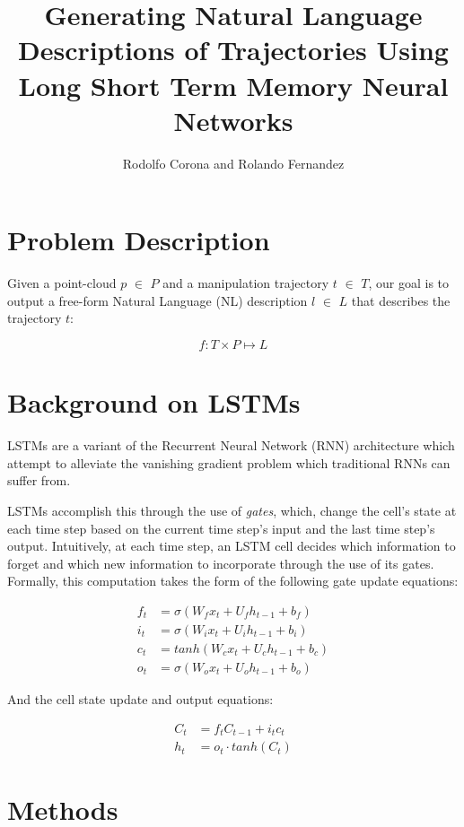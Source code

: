 \documentclass[letterpaper, 12 pt, conference]{ieeeconf}
\title{\LARGE \bf
Generating Natural Language Descriptions of Trajectories Using Long Short Term Memory Neural Networks}
\author{Rodolfo Corona and Rolando Fernandez}
\begin{document}
\maketitle
\thispagestyle{empty}
\pagestyle{empty}

\section{Problem Description}

Given a point-cloud $p$ $\in$ $P$ and a manipulation trajectory $t$ $\in$ $T$, our goal is to output a free-form  Natural Language (NL) description $l$ $\in$ $L$ that describes the trajectory $t$:

\begin{equation}
f: T\times P \mapsto L
\end{equation}

\section{Background on LSTMs}

LSTMs are a variant of the Recurrent Neural Network (RNN) architecture which attempt to alleviate the vanishing gradient problem which traditional RNNs can suffer from. 
\par
LSTMs accomplish this through the use of \textit{gates}, which, change the cell's state at each time step based on the current time step's input and the last time step's output. Intuitively, at each time step, an LSTM cell decides which information to forget and which new information to incorporate through the use of its gates. Formally, this computation takes the form of the following gate update equations: 

\begin{align*}
f_t &= \sigma (W_fx_t + U_fh_{t-1}+b_f) \\
i_t&=\sigma (W_ix_t + U_ih_{t-1}+b_i) \\
c_t &= tanh (W_cx_t  + U_c h_{t-1}+b_c) \\
o_t &= \sigma (W_o x_t + U_o h_{t-1} + b_o)
\end{align*}

And the cell state update and output equations:

\begin{align*}
C_t &= f_tC_{t-1}+ i_t c_t \\
h_t&= o_t \cdot tanh(C_t)
\end{align*}


\section{Methods}
\end{document}
